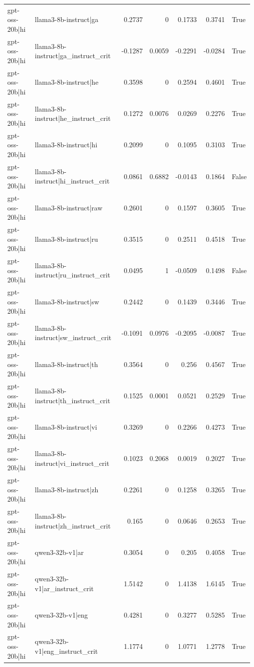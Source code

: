 \begin{table}
\begin{tabular}{l l r r r r l}
gpt-oss-20b|hi & llama3-8b-instruct|ga & 0.2737 & 0 & 0.1733 & 0.3741 & True \\
gpt-oss-20b|hi & llama3-8b-instruct|ga_instruct_crit & -0.1287 & 0.0059 & -0.2291 & -0.0284 & True \\
gpt-oss-20b|hi & llama3-8b-instruct|he & 0.3598 & 0 & 0.2594 & 0.4601 & True \\
gpt-oss-20b|hi & llama3-8b-instruct|he_instruct_crit & 0.1272 & 0.0076 & 0.0269 & 0.2276 & True \\
gpt-oss-20b|hi & llama3-8b-instruct|hi & 0.2099 & 0 & 0.1095 & 0.3103 & True \\
gpt-oss-20b|hi & llama3-8b-instruct|hi_instruct_crit & 0.0861 & 0.6882 & -0.0143 & 0.1864 & False \\
gpt-oss-20b|hi & llama3-8b-instruct|raw & 0.2601 & 0 & 0.1597 & 0.3605 & True \\
gpt-oss-20b|hi & llama3-8b-instruct|ru & 0.3515 & 0 & 0.2511 & 0.4518 & True \\
gpt-oss-20b|hi & llama3-8b-instruct|ru_instruct_crit & 0.0495 & 1 & -0.0509 & 0.1498 & False \\
gpt-oss-20b|hi & llama3-8b-instruct|sw & 0.2442 & 0 & 0.1439 & 0.3446 & True \\
gpt-oss-20b|hi & llama3-8b-instruct|sw_instruct_crit & -0.1091 & 0.0976 & -0.2095 & -0.0087 & True \\
gpt-oss-20b|hi & llama3-8b-instruct|th & 0.3564 & 0 & 0.256 & 0.4567 & True \\
gpt-oss-20b|hi & llama3-8b-instruct|th_instruct_crit & 0.1525 & 0.0001 & 0.0521 & 0.2529 & True \\
gpt-oss-20b|hi & llama3-8b-instruct|vi & 0.3269 & 0 & 0.2266 & 0.4273 & True \\
gpt-oss-20b|hi & llama3-8b-instruct|vi_instruct_crit & 0.1023 & 0.2068 & 0.0019 & 0.2027 & True \\
gpt-oss-20b|hi & llama3-8b-instruct|zh & 0.2261 & 0 & 0.1258 & 0.3265 & True \\
gpt-oss-20b|hi & llama3-8b-instruct|zh_instruct_crit & 0.165 & 0 & 0.0646 & 0.2653 & True \\
gpt-oss-20b|hi & qwen3-32b-v1|ar & 0.3054 & 0 & 0.205 & 0.4058 & True \\
gpt-oss-20b|hi & qwen3-32b-v1|ar_instruct_crit & 1.5142 & 0 & 1.4138 & 1.6145 & True \\
gpt-oss-20b|hi & qwen3-32b-v1|eng & 0.4281 & 0 & 0.3277 & 0.5285 & True \\
gpt-oss-20b|hi & qwen3-32b-v1|eng_instruct_crit & 1.1774 & 0 & 1.0771 & 1.2778 & True \\

\end{tabular}
\end{table}
